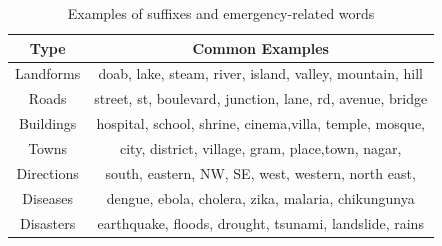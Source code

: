 \begin{table}[tb]
\centering
	\begin{tabular}{|c|c|}
	\hline
	Type & Common Examples\\ \hline
	
	Landforms & doab, lake, steam, river, island, valley, mountain, hill \\
	Roads & street, st, boulevard, junction, lane, rd, avenue, bridge\\
	Buildings & hospital, school, shrine, cinema,villa, temple, mosque,  \\
	Towns & city, district, village, gram, place,town, nagar,  \\
	Directions & south, eastern, NW, SE, west, western, north east,\\
	\hline
	Diseases & dengue, ebola, cholera, zika, malaria, chikungunya  \\
	Disasters & earthquake, floods, drought, tsunami, landslide, rains\\
	
	\hline
	\end{tabular}
  	\caption{Examples of suffixes and emergency-related words}
	\label{tab:Example list}
\vspace*{-5mm}
\end{table}

